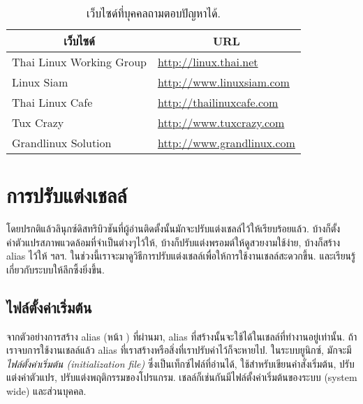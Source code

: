 \begin{thwbr}
\begin{table}[!htb]
\caption{เว็บไซด์ที่บุคคลถามตอบปัญหาได้.}\label{tab:forums}
\bigskip
\begin{tabular}{l|p{}}
\hline
\multicolumn{1}{c|}{เว็บไซด์} & \multicolumn{1}{|c}{URL}\\
\hline
Thai Linux Working Group & \url{http://linux.thai.net}\\
Linux Siam & \url{http://www.linuxsiam.com}\\
Thai Linux Cafe & \url{http://thailinuxcafe.com}\\
Tux Crazy & \url{http://www.tuxcrazy.com}\\
Grandlinux Solution & \url{http://www.grandlinux.com}\\
\hline
\end{tabular}
\end{table}



\section{การปรับแต่งเชลล์}
โดยปรกติแล้วลินุกซ์ดิสทริบิวชันที่ผู้อ่านติดตั้งนั้นมักจะปรับแต่งเชลล์ไว้ให้เรียบร้อยแล้ว. บ้างก็ตั้งค่าตัวแปรสภาพแวดล้อมที่จำเป็นต่างๆไว้ให้, บ้างก็ปรับแต่งพรอมต์ให้ดูสวยงามใช้ง่าย, บ้างก็สร้าง alias ไว้ให้ ฯลฯ. ในช่วงนี้เราจะมาดูวิธีการปรับแต่งเชลล์เพื่อให้การใช้งานเชลล์สะดวกขึ้น. และเรียนรู้เกี่ยวกับระบบให้ลึกซึ้งยิ่งขึ้น.

\subsection{ไฟล์ตั้งค่าเริ่มต้น}
จากตัวอย่างการสร้าง alias (หน้า \pageref{sec:alias}) ที่ผ่านมา, alias ที่สร้างนั้นจะใช้ได้ในเชลล์ที่ทำงานอยู่เท่านั้น. ถ้าเราจบการใช้งานเชลล์แล้ว alias ที่เราสร้างหรือสิ่งที่เราปรับค่าไว้ก็จะหายไป. ในระบบยูนิกซ์, มักจะมี\emph{ไฟล์ตั้งค่าเริ่มต้น (initialization file)} ซึ่งเป็นเท็กซ์ไฟล์ที่อ่านได้, ใช้สำหรับเขียนคำสั่งเริ่มต้น, ปรับแต่งค่าตัวแปร, ปรับแต่งพฤติกรรมของโปรแกรม. เชลล์ก็เช่นกันมีไฟล์ตั้งค่าเริ่มต้นของระบบ (system wide) และส่วนบุคคล.


\end{thwbr}
